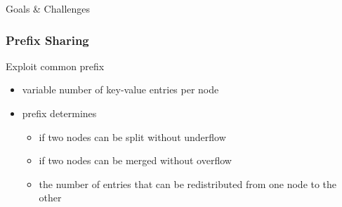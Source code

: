 \documentclass{beamer}
\begin{document}
\begin{section}{Goals \& Challenges}
    \begin{frame}
      \frametitle{Prefix Sharing}
      \begin{block} {Exploit common prefix}
      \hspace*{\fill}
      \pause
      \hspace*{\fill}
      \end{block}
      \pause
      \pause
        \begin{itemize}
            \item variable number of key-value entries per node 
            \pause
            \item prefix determines
            \begin{itemize}
              \item if two nodes can be split without underflow
              \pause
              \item if two nodes can be merged without overflow
              \pause
              \item the number of entries that can be redistributed from one node to the other
            \end{itemize}
        \end{itemize}    
    \end{frame}


\end{section}
\end{document}
